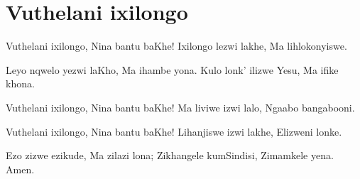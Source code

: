 \starttocol
\chapter{Vuthelani ixilongo}
\nexttocol
\hfill{\it }
\stoptocol
\starttocol
\startlines
{\sc Vuthelani} ixilongo,
Nina bantu baKhe!
Ixilongo lezwi lakhe,
Ma lihlokonyiswe.

Leyo nqwelo yezwi laKho,
Ma ihambe yona.
Kulo lonk' ilizwe Yesu,
Ma ifike khona.

Vuthelani ixilongo,
Nina bantu baKhe!
Ma liviwe izwi lalo,
Ngaabo bangabooni.

Vuthelani ixilongo,
Nina bantu baKhe!
Lihanjiswe izwi lakhe,
Elizweni lonke.

Ezo zizwe ezikude,
Ma zilazi lona;
Zikhangele kumSindisi,
Zimamkele yena. 
          \hfill Amen.~~~~~~~~~

\stoplines
\nexttocol

\stoptocol
